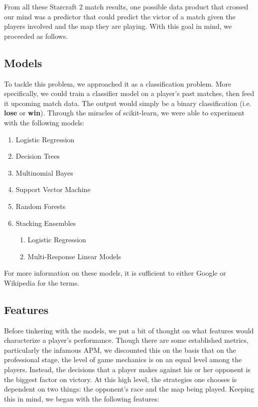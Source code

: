 From all these Starcraft 2 match results, one possible data product that crossed our mind was a predictor that could predict the victor of a match given the players involved and the map they are playing. With this goal in mind, we proceeded as follows. 

\subsection{Models}
To tackle this problem, we approached it as a classification problem. More specifically, we could train a classifier model on a player's past matches, then feed it upcoming match data. The output would simply be a binary classification (i.e. \textbf{lose} or \textbf{win}). Through the miracles of scikit-learn, we were able to experiment with the following models:

\begin{enumerate}
\item Logistic Regression
\item Decision Trees
\item Multinomial Bayes
\item Support Vector Machine
\item Random Forests
\item Stacking Ensembles
\begin{enumerate}
\item Logistic Regression
\item Multi-Response Linear Models
\end{enumerate}
\end{enumerate}

For more information on these models, it is sufficient to either Google or Wikipedia for the terms.

\subsection{Features}
Before tinkering with the models, we put a bit of thought on what features would characterize a player's performance. Though there are some established metrics, particularly the infamous APM, we discounted this on the basis that on the professional stage, the level of game mechanics is on an equal level among the players. Instead, the decisions that a player makes against his or her opponent is the biggest factor on victory. At this high level, the strategies one chooses is dependent on two things: the opponent's race and the map being played. Keeping this in mind, we began with the following features:

